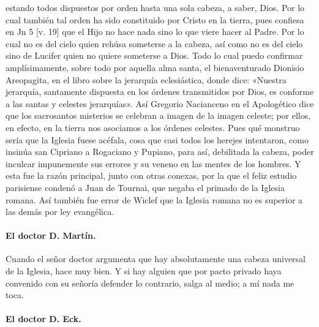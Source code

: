 estando todos dispuestos por orden hasta una sola cabeza, a saber, Dios. Por lo cual también tal orden ha sido constituido por Cristo en la tierra, pues confiesa en Jn 5 [v. 19] que el Hijo no hace nada sino lo que viere hacer al Padre. Por lo cual no es del cielo quien rehúsa someterse a la cabeza, así como no es del cielo sino de Lucifer quien no quiere someterse a Dios. Todo lo cual puedo confirmar amplísimamente, sobre todo por aquella alma santa, el bienaventurado Dionisio Areopagita, en el libro sobre la jerarquía eclesiástica, donde dice: «Nuestra jerarquía, santamente dispuesta en los órdenes transmitidos por Dios, es conforme a las santas \marginpar{\small[256]} y celestes jerarquías». Así Gregorio Nacianceno en el Apologético dice que los sacrosantos misterios se celebran a imagen de la imagen celeste; por ellos, en efecto, en la tierra nos asociamos a los órdenes celestes. Pues qué monstruo sería que la Iglesia fuese acéfala, cosa que casi todos los herejes intentaron, como insinúa san Cipriano a Rogaciano y Pupiano, para así, debilitada la cabeza, poder inculcar impunemente sus errores y su veneno en las mentes de los hombres. Y esta fue la razón principal, junto con otras conexas, por la que el feliz estudio parisiense condenó a Juan de Tournai, que negaba el primado de la Iglesia romana. Así también fue error de Wiclef que la Iglesia romana no es superior a las demás por ley evangélica.

\paragraph*{El doctor D. Martín.}

Cuando el señor doctor argumenta que hay absolutamente una cabeza universal de la Iglesia, hace muy bien. Y si hay alguien que por pacto privado haya convenido con su señoría defender lo contrario, salga al medio; a mí nada me toca.

\paragraph*{El doctor D. Eck.}

